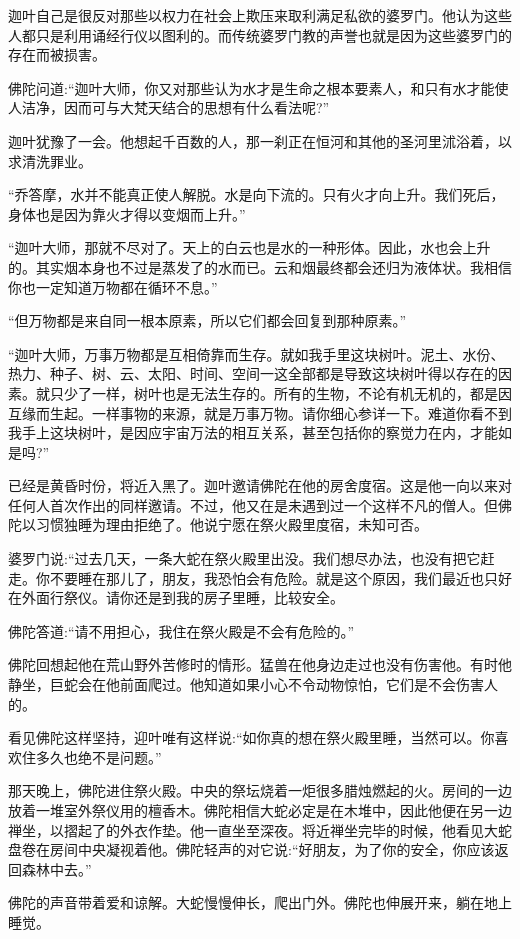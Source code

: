 \documentclass[12pt,twoside,openany]{book}
\begin{document}
迦叶自己是很反对那些以权力在社会上欺压来取利满足私欲的婆罗门。他认为这些人都只是利用诵经行仪以图利的。而传统婆罗门教的声誉也就是因为这些婆罗门的存在而被损害。

佛陀问道:“迦叶大师，你又对那些认为水才是生命之根本要素人，和只有水才能使人洁净，因而可与大梵天结合的思想有什么看法呢?”

迦叶犹豫了一会。他想起千百数的人，那一刹正在恒河和其他的圣河里沭浴着，以求清洗罪业。

“乔答摩，水并不能真正使人解脱。水是向下流的。只有火才向上升。我们死后，身体也是因为靠火才得以变烟而上升。”

“迦叶大师，那就不尽对了。天上的白云也是水的一种形体。因此，水也会上升的。其实烟本身也不过是蒸发了的水而已。云和烟最终都会还归为液体状。我相信你也一定知道万物都在循环不息。”

“但万物都是来自同一根本原素，所以它们都会回复到那种原素。”

“迦叶大师，万事万物都是互相倚靠而生存。就如我手里这块树叶。泥土、水份、热力、种子、树、云、太阳、时间、空间一这全部都是导致这块树叶得以存在的因素。就只少了一样，树叶也是无法生存的。所有的生物，不论有机无机的，都是因互缘而生起。一样事物的来源，就是万事万物。请你细心参详一下。难道你看不到我手上这块树叶，是因应宇宙万法的相互关系，甚至包括你的察觉力在内，才能如是吗?”

已经是黄昏时份，将近入黑了。迦叶邀请佛陀在他的房舍度宿。这是他一向以来对任何人首次作出的同样邀请。不过，他又在是未遇到过一个这样不凡的僧人。但佛陀以习惯独睡为理由拒绝了。他说宁愿在祭火殿里度宿，未知可否。

婆罗门说:“过去几天，一条大蛇在祭火殿里出没。我们想尽办法，也没有把它赶走。你不要睡在那儿了，朋友，我恐怕会有危险。就是这个原因，我们最近也只好在外面行祭仪。请你还是到我的房子里睡，比较安全。

佛陀答道:“请不用担心，我住在祭火殿是不会有危险的。”

佛陀回想起他在荒山野外苦修时的情形。猛兽在他身边走过也没有伤害他。有时他静坐，巨蛇会在他前面爬过。他知道如果小心不令动物惊怕，它们是不会伤害人的。

看见佛陀这样坚持，迎叶唯有这样说:“如你真的想在祭火殿里睡，当然可以。你喜欢住多久也绝不是问题。”

那天晚上，佛陀进住祭火殿。中央的祭坛烧着一炬很多腊烛燃起的火。房间的一边放着一堆室外祭仪用的檀香木。佛陀相信大蛇必定是在木堆中，因此他便在另一边禅坐，以摺起了的外衣作垫。他一直坐至深夜。将近禅坐完毕的时候，他看见大蛇盘卷在房间中央凝视着他。佛陀轻声的对它说:“好朋友，为了你的安全，你应该返回森林中去。”

佛陀的声音带着爱和谅解。大蛇慢慢伸长，爬出门外。佛陀也伸展开来，躺在地上睡觉。
\end{document}
